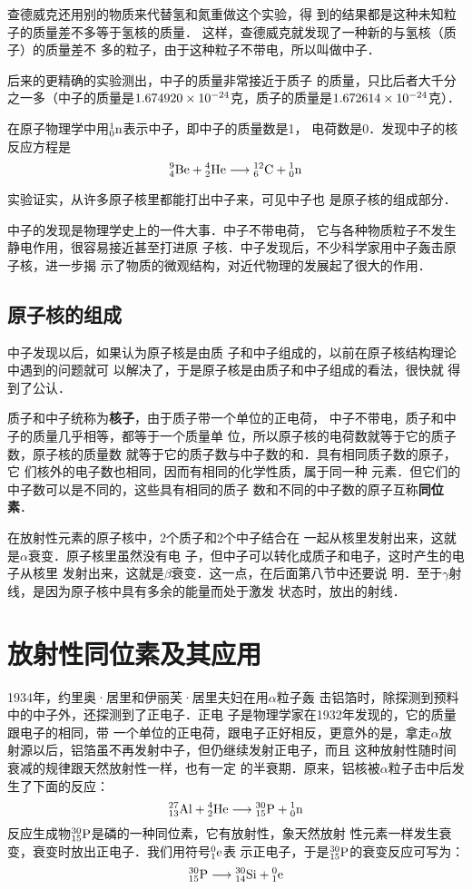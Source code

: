 查德威克还用别的物质来代替氢和氮重做这个实验，得
到的结果都是这种未知粒子的质量差不多等于氢核的质量．
这样，查德威克就发现了一种新的与氢核（质子）的质量差不
多的粒子，由于这种粒子不带电，所以叫做中子．

后来的更精确的实验测出，中子的质量非常接近于质子
的质量，只比后者大千分之一多（中子的质量是$1.674920\x
10^{-24}$克，质子的质量是$1.672614\x10^{-24}$克）．

在原子物理学中用$\atom{n}{1}{0}$表示中子，即中子的质量数是1，
电荷数是0．发现中子的核反应方程是
\[\atom{Be}{9}{4}+\atom{He}{4}{2}\longrightarrow \atom{C}{12}{6}+\atom{n}{1}{0}  \]

实验证实，从许多原子核里都能打出中子来，可见中子也
是原子核的组成部分．

中子的发现是物理学史上的一件大事．中子不带电荷，
它与各种物质粒子不发生静电作用，很容易接近甚至打进原
子核．中子发现后，不少科学家用中子轰击原子核，进一步揭
示了物质的微观结构，对近代物理的发展起了很大的作用．

\subsection{原子核的组成}

中子发现以后，如果认为原子核是由质
子和中子组成的，以前在原子核结构理论中遇到的问题就可
以解决了，于是原子核是由质子和中子组成的看法，很快就
得到了公认．

质子和中子统称为\textbf{核子}，由于质子带一个单位的正电荷，
中子不带电，质子和中子的质量几乎相等，都等于一个质量单
位，所以原子核的电荷数就等于它的质子数，原子核的质量数
就等于它的质子数与中子数的和．具有相同质子数的原子，它
们核外的电子数也相同，因而有相同的化学性质，属于同一种
元素．但它们的中子数可以是不同的，这些具有相同的质子
数和不同的中子数的原子互称\textbf{同位素}．

在放射性元素的原子核中，2个质子和2个中子结合在
一起从核里发射出来，这就是$\alpha$衰变．原子核里虽然没有电
子，但中子可以转化成质子和电子，这时产生的电子从核里
发射出来，这就是$\beta$衰变．这一点，在后面第八节中还要说
明．至于$\gamma$射线，是因为原子核中具有多余的能量而处于激发
状态时，放出的射线．


\section{放射性同位素及其应用}
1934年，约里奥·居里和伊丽芙·居里夫妇在用$\alpha$粒子轰
击铝箔时，除探测到预料中的中子外，还探测到了正电子．正电
子是物理学家在1932年发现的，它的质量跟电子的相同，带
一个单位的正电荷，跟电子正好相反，更意外的是，拿走$\alpha$放
射源以后，铝箔虽不再发射中子，但仍继续发射正电子，而且
这种放射性随时间衰减的规律跟天然放射性一样，也有一定
的半衰期．原来，铝核被$\alpha$粒子击中后发生了下面的反应：
\[\atom{Al}{27}{13}+\atom{He}{4}{2}\longrightarrow\atom{P}{30}{15}+\atom{n}{1}{0}  \]
反应生成物$\atom{P}{30}{15}$是磷的一种同位素，它有放射性，象天然放射
性元素一样发生衰变，衰变时放出正电子．我们用符号$\atom{e}{0}{1}$表
示正电子，于是$\atom{P}{30}{15}$的衰变反应可写为：
\[\atom{P}{30}{15}\longrightarrow \atom{Si}{30}{14}+\atom{e}{0}{1} \]

